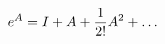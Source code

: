 \documentclass[preview]{standalone}
\begin{document}
\begin{align*}
e^{A} = I + {A} + {1 \over 2!} {A}^2 + \dots
\end{align*}
\end{document}
